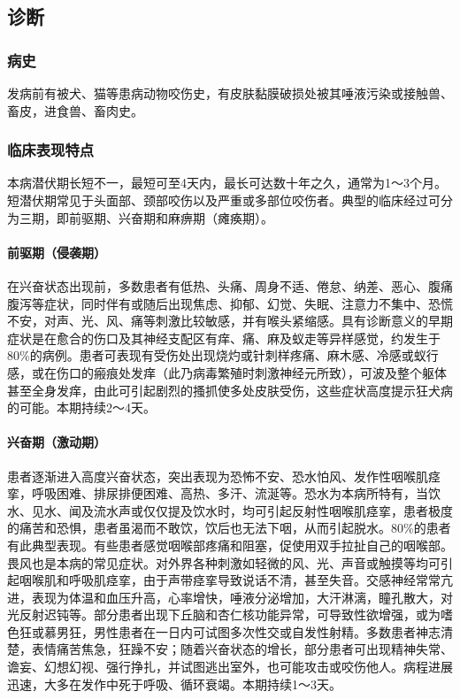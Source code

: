 \subsection{诊断}

\subsubsection{病史}

发病前有被犬、猫等患病动物咬伤史，有皮肤黏膜破损处被其唾液污染或接触兽、畜皮，进食兽、畜肉史。

\subsubsection{临床表现特点}

本病潜伏期长短不一，最短可至4天内，最长可达数十年之久，通常为1～3个月。短潜伏期常见于头面部、颈部咬伤以及严重或多部位咬伤者。典型的临床经过可分为三期，即前驱期、兴奋期和麻痹期（瘫痪期）。

\paragraph{前驱期（侵袭期）}

在兴奋状态出现前，多数患者有低热、头痛、周身不适、倦怠、纳差、恶心、腹痛腹泻等症状，同时伴有或随后出现焦虑、抑郁、幻觉、失眠、注意力不集中、恐慌不安，对声、光、风、痛等刺激比较敏感，并有喉头紧缩感。具有诊断意义的早期症状是在愈合的伤口及其神经支配区有痒、痛、麻及蚁走等异样感觉，约发生于80\%的病例。患者可表现有受伤处出现烧灼或针刺样疼痛、麻木感、冷感或蚁行感，或在伤口的瘢痕处发痒（此乃病毒繁殖时刺激神经元所致），可波及整个躯体甚至全身发痒，由此可引起剧烈的搔抓使多处皮肤受伤，这些症状高度提示狂犬病的可能。本期持续2～4天。

\paragraph{兴奋期（激动期）}

患者逐渐进入高度兴奋状态，突出表现为恐怖不安、恐水怕风、发作性咽喉肌痉挛，呼吸困难、排尿排便困难、高热、多汗、流涎等。恐水为本病所特有，当饮水、见水、闻及流水声或仅仅提及饮水时，均可引起反射性咽喉肌痉挛，患者极度的痛苦和恐惧，患者虽渴而不敢饮，饮后也无法下咽，从而引起脱水。80\%的患者有此典型表现。有些患者感觉咽喉部疼痛和阻塞，促使用双手拉扯自己的咽喉部。畏风也是本病的常见症状。对外界各种刺激如轻微的风、光、声音或触摸等均可引起咽喉肌和呼吸肌痉挛，由于声带痉挛导致说话不清，甚至失音。交感神经常常亢进，表现为体温和血压升高，心率增快，唾液分泌增加，大汗淋漓，瞳孔散大，对光反射迟钝等。部分患者出现下丘脑和杏仁核功能异常，可导致性欲增强，或为嗜色狂或慕男狂，男性患者在一日内可试图多次性交或自发性射精。多数患者神志清楚，表情痛苦焦急，狂躁不安；随着兴奋状态的增长，部分患者可出现精神失常、谵妄、幻想幻视、强行挣扎，并试图逃出室外，也可能攻击或咬伤他人。病程进展迅速，大多在发作中死于呼吸、循环衰竭。本期持续1～3天。

